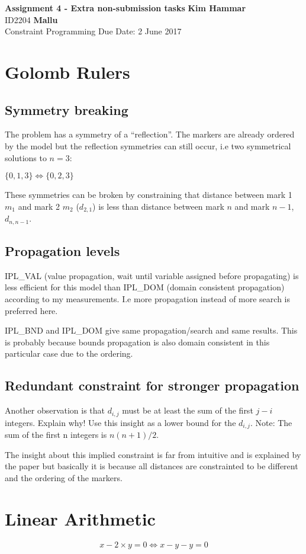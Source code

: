 \documentclass[a4paper, 11pt]{article}
\begin{document}
\noindent
\large\textbf{Assignment 4  - Extra non-submission tasks} \hfill \textbf{Kim Hammar} \\
\normalsize ID2204 \hfill  \textbf{Mallu} \\
Constraint Programming \hfill Due Date: 2 June 2017\\

\section*{Golomb Rulers}
\subsection*{Symmetry breaking}
The problem has a symmetry of a ``reflection''. The markers are already ordered by the model but the reflection symmetries can still occur, i.e two symmetrical solutions to $n = 3$:

$\{0,1,3\} \iff \{0,2,3\}$

These symmetries can be broken by constraining that distance between mark 1 $m_1$ and mark 2 $m_2$ ($d_{2,1}$) is less than distance between mark $n$ and mark $n-1$, $d_{n, n-1}$.
\subsection*{Propagation levels}
IPL\_VAL (value propagation, wait until variable assigned before propagating) is less efficient for this model than IPL\_DOM (domain consistent propagation) according to my measurements. I.e more propagation instead of more search is preferred here.

IPL\_BND and IPL\_DOM give same propagation/search and same results. This is probably because bounds propagation is also domain consistent in this particular case due to the ordering.
\subsection*{Redundant constraint for stronger propagation}
Another observation is that $d_{i,j}$ must be at least the sum of the first $j - i$
integers. Explain why! Use this insight as a lower bound for the $d_{i,j}$. Note: The sum of the first n integers is $n(n + 1)/2$.

The insight about this implied constraint is far from intuitive and is explained by the paper but basically it is because all distances are constrainted to be different and the ordering of the markers. 

\section*{Linear Arithmetic}
$$x - 2 \times y = 0 \iff x - y - y = 0$$
\end{document}
